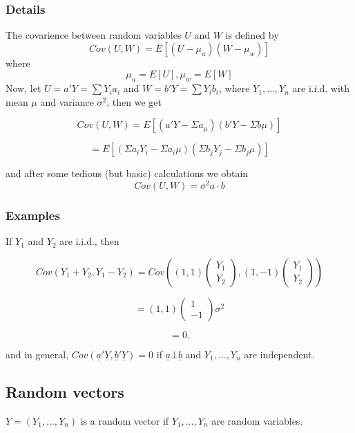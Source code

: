 \documentclass[12pt,a4paper]{article}
\theoremstyle{regla}
\theoremstyle{remark}
\theoremstyle{definition}
\theoremstyle{nonumberbreak}
\begin{document}
\subsubsection{Details}
The covarience between random variables $U$ and $W$ is defined by\\
$$Cov(U,W)= E[(U-\mu_u)(W-\mu_w)]$$
where 
$$\mu_u=E[U],\mu_w=E[W]$$
Now, let $U=a'Y=\sum Y_ia_i$ and $W=b'Y=\sum Y_ib_i$, where $Y_1,\ldots,Y_n$ are i.i.d. with mean $\mu$ and variance $\sigma^2$, then we get

$$Cov(U,W)= E[(a'Y-\Sigma a_\mu)(b'Y-\Sigma b\mu)]$$

$$= E[(\Sigma a_iY_i -\Sigma a_i\mu)(\Sigma b_jY_j -\Sigma b_j\mu )]$$

        

and after some tedious (but basic) calculations we obtain
$$Cov(U,W)=\sigma^2a\cdot b$$
\subsubsection{Examples}
\begin{xmpl}
If $Y_1$ and $Y_2$ are i.i.d., then

$$Cov(Y_1+Y_2, Y_1-Y_2)=Cov\left( (1,1)
\begin{pmatrix}Y_1\\
Y_2
\end{pmatrix}
,  (1,-1) 
\begin{pmatrix}
Y_1\\
Y_2
\end{pmatrix}
\right)$$

$$=(1,1)
\begin{pmatrix}
1\\
-1
\end{pmatrix}\sigma^2$$

$$=0.$$

and in general, $Cov(\underline{a}'\underline{Y}, \underline{b}'\underline{Y})=0$ if $\underline{a}\bot \underline{b}$ and $Y_1,\ldots,Y_n$ are independent.
\end{xmpl}


\subsection{Random vectors}
\begin{fbox}
\begin{minipage}{0.97\textwidth}
$Y= (Y_1, \ldots , Y_n)$ is a random vector if $Y_1, \ldots , Y_n$ are random variables.
\end{minipage}
\end{fbox}
\end{document}
